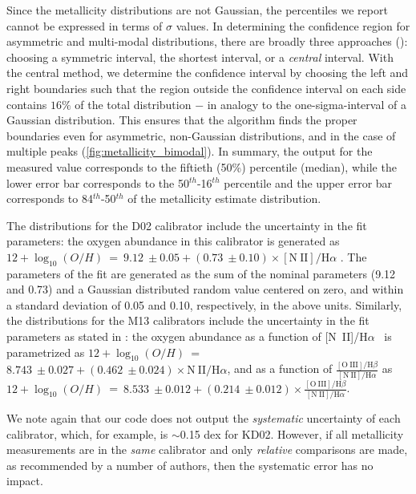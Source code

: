 \documentclass{emulateapj}
\newcommand{\oxabinline}{\ensuremath{12 + \log_{10}(O/H)}}
\newcommand{\ha}{\ensuremath{\mathrm{H}\alpha}}
\begin{document}
Since the metallicity distributions are not Gaussian, the percentiles
we report cannot be expressed in terms of $\sigma$ values. In
determining the confidence region for asymmetric and multi-modal
distributions, there are broadly three approaches
(\citealt{andrae10}): choosing a symmetric interval, the shortest
interval, or a \emph{central} interval.  With the central method, we
determine the confidence interval by choosing the left and right
boundaries such that the region outside the confidence interval on
each side contains $16\%$ of the total distribution $-$ in analogy to
the one-sigma-interval of a Gaussian distribution. This ensures that
the algorithm finds the proper boundaries even for asymmetric,
non-Gaussian distributions, and in the case of multiple peaks
(\autoref{fig:metallicity_bimodal}). In summary, the output for the
measured value corresponds to the fiftieth (50\%) percentile (median),
while the lower error bar corresponds to the 50$^{th}$-16$^{th}$
percentile and the upper error bar corresponds to 84$^{th}$-50$^{th}$
of the metallicity estimate distribution.

The distributions for the D02 calibrator include the uncertainty in
the fit parameters: the oxygen abundance in this calibrator is
generated as \oxabinline~=~$9.12~\pm 0.05 + (0.73~\pm
0.10)\times\mathrm{[N~II]}/\ha$ \citep{denicolo02}. The parameters of
the fit are generated as the sum of the nominal parameters (9.12 and
0.73) and a Gaussian distributed random value centered on zero, and
within a standard deviation of 0.05 and 0.10, respectively, in the
above units.  Similarly, the distributions for the M13 calibrators
include the uncertainty in the fit parameters as stated in
\citet{marino13}: the oxygen abundance as a function of [N~II]/\ha~ is
parametrized as \oxabinline~=~$8.743~\pm 0.027 + (0.462~\pm
0.024)\times\mathrm{N~II}/\ha$, and as a function of
$\frac{\mathrm{[O~III]/H}\beta} {\mathrm{[N~II]/H}\alpha}$ as
\oxabinline~=~$8.533~\pm 0.012 + (0.214~\pm
0.012)\times\frac{\mathrm{[O~III]/H}\beta} {\mathrm{[N~II]/H}\alpha}$.

We note again that our code does not output the \emph{systematic}
uncertainty of each calibrator, which, for example, is $\sim$0.15
\nolinebreak dex for KD02. However, if all metallicity measurements
are in the \emph{same} calibrator and only \emph{relative} comparisons
are made, as recommended by a number of authors, then the systematic
error has no impact.
\end{document}

